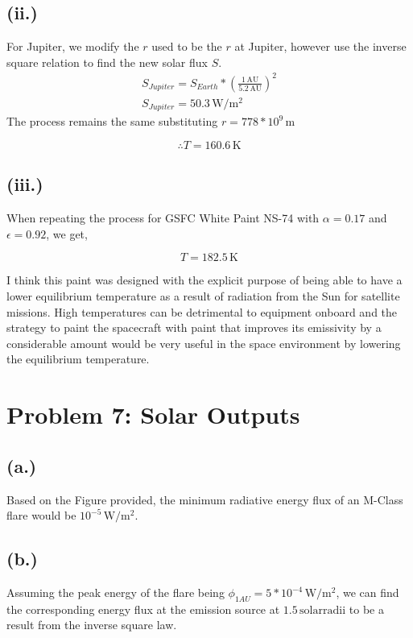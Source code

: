 \documentclass[11pt]{article}
\begin{document}
\subsection*{(ii.)}
For Jupiter, we modify the $r$ used to be the $r$ at Jupiter, however use the inverse square
relation to find the new solar flux $S$. 
\[
\begin{gathered}
S_{Jupiter} = S_{Earth}*(\frac{1 \, \mathrm{AU}}{5.2 \, \mathrm{AU}})^2 \\
S_{Jupiter} = 50.3 \, \mathrm{W/m^2}
\end{gathered}
\]
The process remains the same substituting $r = 778*10^9 \, \mathrm{m}$

\[
\boxed{\therefore T = 160.6 \, \mathrm{K}}
\]

\subsection*{(iii.)}
When repeating the process for GSFC White Paint NS-74 with $\alpha = 0.17$
and $\epsilon = 0.92$, we get,

\[
\boxed{T = 182.5 \, \mathrm{K}}
\]

\hspace*{2em}I think this paint was designed with the explicit purpose of being able to 
have a lower equilibrium temperature as a result of radiation from the Sun 
for satellite missions. High temperatures can be detrimental to equipment
onboard and the strategy to paint the spacecraft with paint that improves
its emissivity by a considerable amount would be very useful in the space 
environment by lowering the equilibrium temperature. 

\section*{Problem 7: Solar Outputs}


\subsection*{{(a.)}}
Based on the Figure provided, the minimum
radiative energy flux of an M-Class flare
would be $10^{-5} \, \mathrm{W/m^2}$.

\subsection*{{(b.)}}
Assuming the peak energy of the flare being $\phi_{1AU}=5*10^{-4} \, \mathrm{W/m^2}$, 
we can find the corresponding energy flux at the emission source at $1.5 \, \mathrm{solar radii}$
to be a result from the inverse square law.
\end{document}
